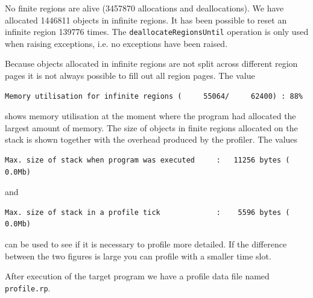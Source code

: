 \documentclass[12pt]{book}
\begin{document}
No finite regions are alive (3457870 allocations and deallocations).  We
have allocated 1446811 objects in infinite regions. It has been possible to
reset an infinite region 139776 times. The {\tt deallocateRegionsUntil}
operation is only used when raising exceptions, i.e. no exceptions have
been raised.

Because objects allocated in infinite regions are not split across
different region pages it is not always possible to fill out all
region pages. The value

\begin{center}
\begin{footnotesize}
\begin{verbatim}
Memory utilisation for infinite regions (     55064/     62400) : 88%
\end{verbatim}
\end{footnotesize}
\end{center}

\noindent
shows memory utilisation at the moment where the program had allocated the
largest amount of memory. The size of objects in finite regions allocated
on the stack is shown together with the overhead produced by the profiler.
The values

\begin{center}
\begin{footnotesize}
\begin{verbatim}
Max. size of stack when program was executed     :   11256 bytes ( 0.0Mb)
\end{verbatim}
\end{footnotesize}
\end{center}

\noindent
and

\begin{center}
\begin{footnotesize}
\begin{verbatim}
Max. size of stack in a profile tick             :    5596 bytes ( 0.0Mb)
\end{verbatim}
\end{footnotesize}
\end{center}

\noindent
can be used to see if it is necessary to profile more detailed.  If
the difference between the two figures is large you can profile with a
smaller time slot.

After execution of the target program we have a profile data file named
{\tt profile.rp}.

\end{document}
